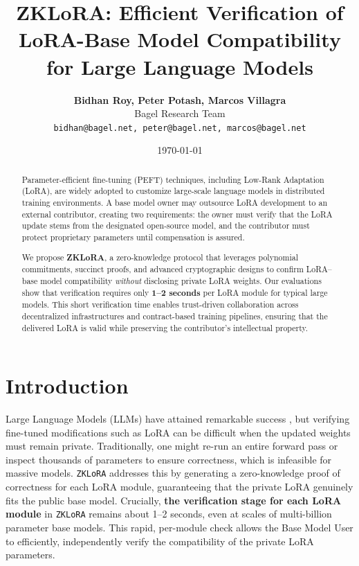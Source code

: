 \documentclass[11pt]{article}
\title{\textbf{ZKLoRA: Efficient Verification of LoRA-Base Model Compatibility for Large Language Models}}
\author{
    \textbf{Bidhan Roy, Peter Potash, Marcos Villagra} \\
    Bagel Research Team\footnotemark[1] \\
    \texttt{bidhan@bagel.net, peter@bagel.net, marcos@bagel.net}
}
\date{\today}
\begin{document}
\maketitle


\begin{abstract}
    Parameter-efficient fine-tuning (PEFT) techniques, including Low-Rank Adaptation (LoRA), are widely adopted to customize large-scale language models in distributed training environments. A base model owner may outsource LoRA development to an external contributor, creating two requirements: the owner must verify that the LoRA update stems from the designated open-source model, and the contributor must protect proprietary parameters until compensation is assured.
    
    We propose \textbf{ZKLoRA}, a zero-knowledge protocol that leverages polynomial commitments, succinct proofs, and advanced cryptographic designs to confirm LoRA–base model compatibility \emph{without} disclosing private LoRA weights. Our evaluations show that verification requires only \textbf{1--2 seconds} per LoRA module for typical large models. This short verification time enables trust-driven collaboration across decentralized infrastructures and contract-based training pipelines, ensuring that the delivered LoRA is valid while preserving the contributor’s intellectual property.
\end{abstract}

\section{Introduction}
Large Language Models (LLMs) have attained remarkable success \cite{brown2020language, devlin2018bert}, but verifying fine-tuned modifications such as LoRA \cite{hu2021lora} can be difficult when the updated weights must remain private. 
Traditionally, one might re-run an entire forward pass or inspect thousands of parameters to ensure correctness, which is infeasible for massive models. 
\texttt{ZKLoRA} addresses this by generating a zero-knowledge proof of correctness for each LoRA module, guaranteeing that the private LoRA genuinely fits the public base model. 
Crucially, \textbf{the verification stage for each LoRA module} in \texttt{ZKLoRA} remains about 1--2 seconds, even at scales of multi-billion parameter base models. 
This rapid, per-module check allows the Base Model User to efficiently, independently verify the compatibility of the private LoRA parameters.
\end{document}

